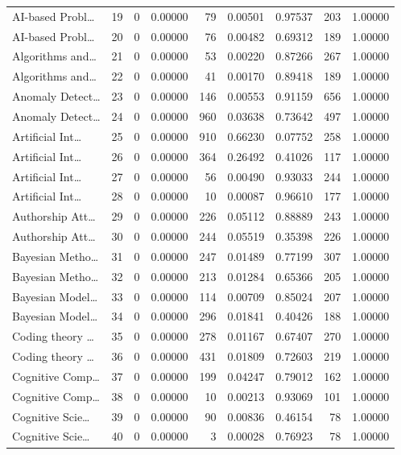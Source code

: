 \begin{table}
\begin{tabular}{lrrrrrrrr}
AI-based Probl… & 19 & 0 & 0.00000 & 79 & 0.00501 & 0.97537 & 203 & 1.00000 \\
AI-based Probl… & 20 & 0 & 0.00000 & 76 & 0.00482 & 0.69312 & 189 & 1.00000 \\
Algorithms and… & 21 & 0 & 0.00000 & 53 & 0.00220 & 0.87266 & 267 & 1.00000 \\
Algorithms and… & 22 & 0 & 0.00000 & 41 & 0.00170 & 0.89418 & 189 & 1.00000 \\
Anomaly Detect… & 23 & 0 & 0.00000 & 146 & 0.00553 & 0.91159 & 656 & 1.00000 \\
Anomaly Detect… & 24 & 0 & 0.00000 & 960 & 0.03638 & 0.73642 & 497 & 1.00000 \\
Artificial Int… & 25 & 0 & 0.00000 & 910 & 0.66230 & 0.07752 & 258 & 1.00000 \\
Artificial Int… & 26 & 0 & 0.00000 & 364 & 0.26492 & 0.41026 & 117 & 1.00000 \\
Artificial Int… & 27 & 0 & 0.00000 & 56 & 0.00490 & 0.93033 & 244 & 1.00000 \\
Artificial Int… & 28 & 0 & 0.00000 & 10 & 0.00087 & 0.96610 & 177 & 1.00000 \\
Authorship Att… & 29 & 0 & 0.00000 & 226 & 0.05112 & 0.88889 & 243 & 1.00000 \\
Authorship Att… & 30 & 0 & 0.00000 & 244 & 0.05519 & 0.35398 & 226 & 1.00000 \\
Bayesian Metho… & 31 & 0 & 0.00000 & 247 & 0.01489 & 0.77199 & 307 & 1.00000 \\
Bayesian Metho… & 32 & 0 & 0.00000 & 213 & 0.01284 & 0.65366 & 205 & 1.00000 \\
Bayesian Model… & 33 & 0 & 0.00000 & 114 & 0.00709 & 0.85024 & 207 & 1.00000 \\
Bayesian Model… & 34 & 0 & 0.00000 & 296 & 0.01841 & 0.40426 & 188 & 1.00000 \\
Coding theory … & 35 & 0 & 0.00000 & 278 & 0.01167 & 0.67407 & 270 & 1.00000 \\
Coding theory … & 36 & 0 & 0.00000 & 431 & 0.01809 & 0.72603 & 219 & 1.00000 \\
Cognitive Comp… & 37 & 0 & 0.00000 & 199 & 0.04247 & 0.79012 & 162 & 1.00000 \\
Cognitive Comp… & 38 & 0 & 0.00000 & 10 & 0.00213 & 0.93069 & 101 & 1.00000 \\
Cognitive Scie… & 39 & 0 & 0.00000 & 90 & 0.00836 & 0.46154 & 78 & 1.00000 \\
Cognitive Scie… & 40 & 0 & 0.00000 & 3 & 0.00028 & 0.76923 & 78 & 1.00000 \\

\end{tabular}
\end{table}
